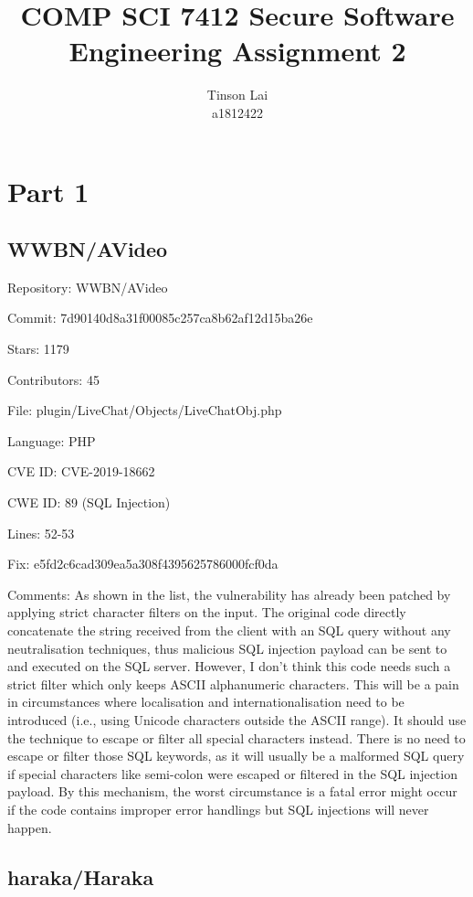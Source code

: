 \documentclass[12pt]{article}
\title{COMP SCI 7412 Secure Software Engineering Assignment 2}
\author{Tinson Lai \\ a1812422}
\date{}
\begin{document}
\maketitle

\section{Part 1}

\subsection{WWBN/AVideo}

Repository: WWBN/AVideo

Commit: 7d90140d8a31f00085c257ca8b62af12d15ba26e

Stars: 1179

Contributors: 45

File: plugin/LiveChat/Objects/LiveChatObj.php

Language: PHP

CVE ID: CVE-2019-18662

CWE ID: 89 (SQL Injection)

Lines: 52-53

Fix: e5fd2c6cad309ea5a308f4395625786000fcf0da

Comments: As shown in the list, the vulnerability has already been patched by applying strict character filters on the input. The original code directly concatenate the string received from the client with an SQL query without any neutralisation techniques, thus malicious SQL injection payload can be sent to and executed on the SQL server. However, I don't think this code needs such a strict filter which only keeps ASCII alphanumeric characters. This will be a pain in circumstances where localisation and internationalisation need to be introduced (i.e., using Unicode characters outside the ASCII range). It should use the technique to escape or filter all special characters instead. There is no need to escape or filter those SQL keywords, as it will usually be a malformed SQL query if special characters like semi-colon were escaped or filtered in the SQL injection payload. By this mechanism, the worst circumstance is a fatal error might occur if the code contains improper error handlings but SQL injections will never happen.

\subsection{haraka/Haraka}
\end{document}
